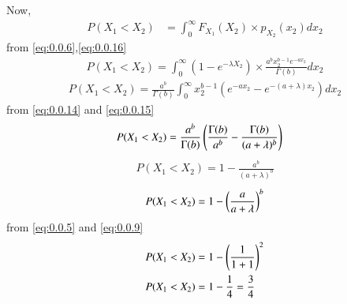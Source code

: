 \documentclass[journal,12pt,twocolumn]{IEEEtran}
\begin{document}
\begin{enumerate}
  Now,
\begin{align}
      P(X_1<X_2)&=\int_{0}^\infty F_{X_1}(X_2) \times p_{X_2}(x_2)dx_2
      \end{align}
      from \eqref{eq:0.0.6},\eqref{eq:0.0.16}
  \begin{align}
     P(X_1<X_2)=\int_{0}^\infty (1-e^{-\lambda X_2})\times \frac{a^b x_2^{b-1}e^{-ax_2}}{\Gamma(b)} dx_2
     \end{align}
     \begin{align}
     P(X_1<X_2)=\frac{a^b}{\Gamma(b)}\int_{0}^\infty x_2^{b-1}(e^{-ax_2}-e^{-(a+\lambda)x_2})dx_2
  \end{align}
      from \eqref{eq:0.0.14} and \eqref{eq:0.0.15}
      \begin{align}
     P(X_1<X_2)&=\frac{a^b}{\Gamma(b)}\left(\frac{\Gamma(b)}{a^b}-\frac{\Gamma(b)}{(a+\lambda)^b}\right)
     \end{align}
 \begin{align}
      P(X_1<X_2)=1-\frac{a^b}{(a+\lambda)^b}
 \end{align}
 \begin{align}
     P(X_1<X_2)=1-\left(\frac{a}{a+\lambda}\right)^b
 \end{align}
 from \eqref{eq:0.0.5} and \eqref{eq:0.0.9}
 \begin{align}
     P(X_1<X_2)&=1-\left(\frac{1}{1+1}\right)^2\\
     P(X_1<X_2)&=1-\frac{1}{4}=\frac{3}{4}
 \end{align}
\end{enumerate}
\end{document}
